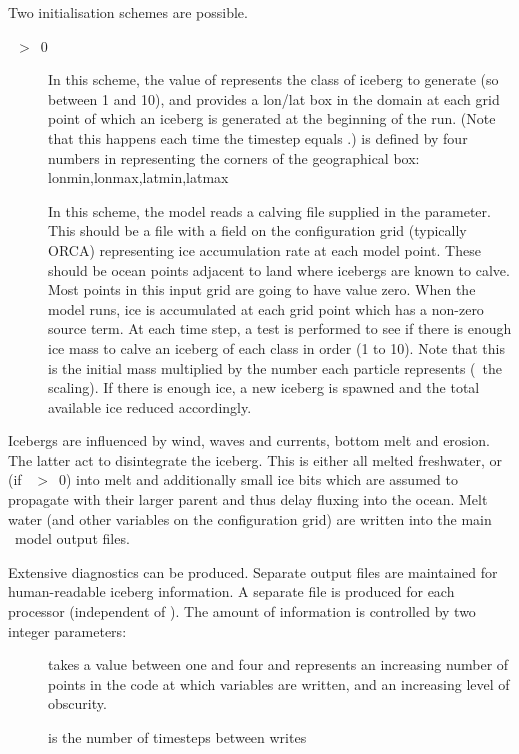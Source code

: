 \documentclass[../main/NEMO_manual]{subfiles}
\begin{document}
Two initialisation schemes are possible.
\begin{description}
\item [{~$>$~0}] In this scheme, the value of  represents the class of iceberg to generate
  (so between 1 and 10), and  provides a lon/lat box in the domain at each grid point of
  which an iceberg is generated at the beginning of the run.
  (Note that this happens each time the timestep equals .)
   is defined by four numbers in  representing the corners of
  the geographical box: lonmin,lonmax,latmin,latmax
\item [{}] In this scheme, the model reads a calving file supplied in the  parameter.
  This should be a file with a field on the configuration grid (typically ORCA)
  representing ice accumulation rate at each model point.
  These should be ocean points adjacent to land where icebergs are known to calve.
  Most points in this input grid are going to have value zero.
  When the model runs, ice is accumulated at each grid point which has a non-zero source term.
  At each time step, a test is performed to see if there is enough ice mass to
  calve an iceberg of each class in order (1 to 10).
  Note that this is the initial mass multiplied by the number each particle represents (\ie\ the scaling).
  If there is enough ice, a new iceberg is spawned and the total available ice reduced accordingly.
\end{description}

Icebergs are influenced by wind, waves and currents, bottom melt and erosion.
The latter act to disintegrate the iceberg.
This is either all melted freshwater,
or (if ~$>$~0) into melt and additionally small ice bits
which are assumed to propagate with their larger parent and thus delay fluxing into the ocean.
Melt water (and other variables on the configuration grid) are written into the main \NEMO\ model output files.

Extensive diagnostics can be produced.
Separate output files are maintained for human-readable iceberg information.
A separate file is produced for each processor (independent of ).
The amount of information is controlled by two integer parameters:
\begin{description}
\item [{}] takes a value between one and four and
  represents an increasing number of points in the code at which variables are written,
  and an increasing level of obscurity.
\item [{}] is the number of timesteps between writes
\end{description}
\end{document}
